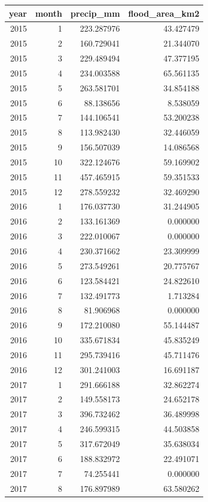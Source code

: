 \begin{tabular}{rrrr}
\toprule
year & month & precip\_mm & flood\_area\_km2 \\
\midrule
2015 & 1 & 223.287976 & 43.427479 \\
2015 & 2 & 160.729041 & 21.344070 \\
2015 & 3 & 229.489494 & 47.377195 \\
2015 & 4 & 234.003588 & 65.561135 \\
2015 & 5 & 263.581701 & 34.854188 \\
2015 & 6 & 88.138656 & 8.538059 \\
2015 & 7 & 144.106541 & 53.200238 \\
2015 & 8 & 113.982430 & 32.446059 \\
2015 & 9 & 156.507039 & 14.086568 \\
2015 & 10 & 322.124676 & 59.169902 \\
2015 & 11 & 457.465915 & 59.351533 \\
2015 & 12 & 278.559232 & 32.469290 \\
2016 & 1 & 176.037730 & 31.244905 \\
2016 & 2 & 133.161369 & 0.000000 \\
2016 & 3 & 222.010067 & 0.000000 \\
2016 & 4 & 230.371662 & 23.309999 \\
2016 & 5 & 273.549261 & 20.775767 \\
2016 & 6 & 123.584421 & 24.822610 \\
2016 & 7 & 132.491773 & 1.713284 \\
2016 & 8 & 81.906968 & 0.000000 \\
2016 & 9 & 172.210080 & 55.144487 \\
2016 & 10 & 335.671834 & 45.835249 \\
2016 & 11 & 295.739416 & 45.711476 \\
2016 & 12 & 301.241003 & 16.691187 \\
2017 & 1 & 291.666188 & 32.862274 \\
2017 & 2 & 149.558173 & 24.652178 \\
2017 & 3 & 396.732462 & 36.489998 \\
2017 & 4 & 246.599315 & 44.503858 \\
2017 & 5 & 317.672049 & 35.638034 \\
2017 & 6 & 188.832972 & 22.491071 \\
2017 & 7 & 74.255441 & 0.000000 \\
2017 & 8 & 176.897989 & 63.580262 \\

\end{tabular}
